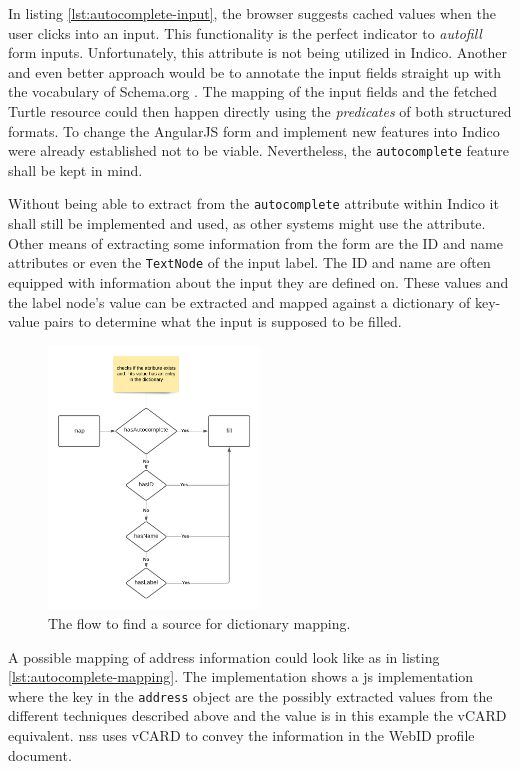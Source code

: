 In listing \ref{lst:autocomplete-input}, the browser suggests cached values when the user clicks into an input. This functionality is the perfect indicator to \textit{autofill} form inputs. Unfortunately, this attribute is not being utilized in Indico. Another and even better approach would be to annotate the input fields straight up with the vocabulary of Schema.org \cite{schema-org}. The mapping of the input fields and the fetched Turtle resource could then happen directly using the \textit{predicates} of both structured formats. To change the AngularJS form and implement new features into Indico were already established not to be viable. Nevertheless, the \texttt{autocomplete} feature shall be kept in mind.

Without being able to extract from the \texttt{autocomplete} attribute within Indico it shall still be implemented and used, as other systems might use the attribute. Other means of extracting some information from the form are the ID and name attributes or even the \texttt{TextNode} of the input label. The ID and name are often equipped with information about the input they are defined on. These values and the label node's value can be extracted and mapped against a dictionary of key-value pairs to determine what the input is supposed to be filled.

\begin{figure}[H]
    \centering
    \includegraphics[width=0.5\textwidth]{prototype/graphs/poc-autocomplete-mapping-flow.png}
    \caption{The flow to find a source for dictionary mapping.}
    \label{fig:poc-autocomplete-mapping-flow}
\end{figure}

A possible mapping of address information could look like as in listing \ref{lst:autocomplete-mapping}. The implementation shows a \gls{js} implementation where the key in the \texttt{address} object are the possibly extracted values from the different techniques described above and the value is in this example the vCARD \cite{vcard-spec} equivalent. \gls{nss} uses vCARD to convey the information in the WebID profile document.

